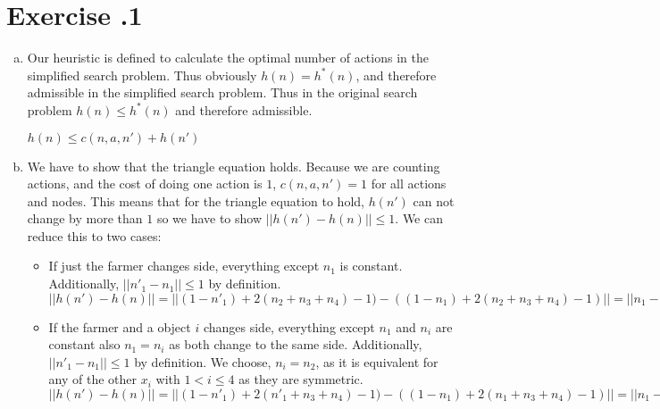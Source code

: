 \documentclass[11pt]{scrartcl}
\newcounter{sheetnr}
\newenvironment{exercise}[2][]{\section*{Exercise \thesheetnr.#2\expandafter\ifstrempty\expandafter{#1}{}{\ (#1)}}}{}
\newenvironment{subexercises}{\begin{enumerate}[a), font=\bfseries, wide, labelindent=0pt]}{\end{enumerate}}
\begin{document}
\begin{exercise}[Heuristics]{1}
\begin{subexercises}
            \begin{itemize}
                \item $(1-n_1) = 1$ when the farmer is on the goal shore and thus has to go back and get another object from the starting shore. $(1-n_1) = 0$ if he is already on the starting shore and thus doesn't have to travel back to the starting shore to get another object.
                \item $2(n_2 + n_3 + n_4) - 1$: for each object he brings from the starting shore he has to travel back except for the last one he brings to the other side.
            \end{itemize}
        
            \item Our heuristic is defined to calculate the optimal number of actions in the simplified search problem. Thus obviously $h(n) = h^*(n)$, and therefore admissible in the simplified search problem. Thus in the original search problem $h(n) \leq h^*(n)$ and therefore admissible.
        
            \begin{center}
                $h(n) \leq c(n,a,n') + h(n')$
            \end{center}
        
            \item We have to show that the triangle equation holds. Because we are counting actions, and the cost of doing one action is $1$, $c(n,a,n') = 1$ for all actions and nodes. This means that for the triangle equation to hold, $h(n')$ can not change by more than $1$ so we have to show $||h(n') - h(n)|| \leq 1$. We can reduce this to two cases:
            \begin{itemize}
                \item If just the farmer changes side, everything except $n_1$ is constant. Additionally, $||{n'}_1 - n_1 || \leq 1$ by definition. \\
                $||h(n') - h(n)|| = ||(1 - {n'}_1) + 2(n_2 + n_3 + n_4) - 1) - ((1 - n_1) + 2(n_2 + n_3 + n_4) - 1)|| = ||n_1 - {n'}_1|| \leq 1$ \\
                \item If the farmer and a object $i$ changes side, 
                everything except $n_1$ and $n_i $ are constant also $n_1 = n_i$ as both change to the same side. Additionally, $||{n'}_1 - n_1 || \leq 1$ by definition. We choose, $n_i = n_2$, as it is equivalent for any of the other $x_i$ with $1 < i \leq 4$ as they are symmetric. \\
                $||h(n') - h(n)|| = ||(1 - {n'}_1) + 2({n'}_1 + n_3 + n_4) - 1) - ((1 - n_1) + 2(n_1 + n_3 + n_4) - 1)|| = ||n_1 - {n'}_1 + 2{n'}_1 - 2n_1 || = || {n'}_1 - n_1 || \leq 1$ \\
            \end{itemize}
        

\end{subexercises}
\end{exercise}
\end{document}
